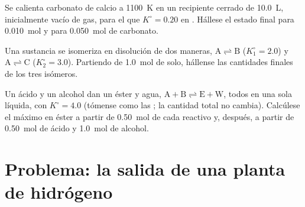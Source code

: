 \begin{exercise}[$\star\star\star$]\label{exo:b1:extent-q-and-k:10}
Se calienta carbonato de calcio a \qty{1100}{K} en un recipiente cerrado
de \qty{10.0}{L}, inicialmente vacío de gas, para el que $K^\circ = 0.20$
en . Hállese el estado final para
\qty{0.010}{mol} y para \qty{0.050}{mol} de carbonato.
\end{exercise}

\begin{exercise}[$\star\star\star$]\label{exo:b1:extent-q-and-k:11}
Una sustancia  se isomeriza en disolución de dos maneras,
$\mathrm{A \rightleftharpoons B}$
($K_1^\circ = 2.0$) y $\mathrm{A \rightleftharpoons C}$ ($K_2^\circ = 3.0$).
Partiendo de \qty{1.0}{mol} de  solo, hállense las cantidades
finales de los tres isómeros.
\end{exercise}

\begin{exercise}[$\star\star\star$]\label{exo:b1:extent-q-and-k:12}
Un ácido  y un alcohol  dan un éster y agua, $\mathrm{A + B
\rightleftharpoons E + W}$, todos en una sola  líquida, con $K^\circ = 4.0$
(tómense como  las ; la cantidad total no
cambia). Calcúlese el  máximo en éster a partir de
\qty{0.50}{mol} de cada reactivo y, después, a partir de \qty{0.50}{mol}
de ácido y \qty{1.0}{mol} de alcohol.
\end{exercise}

\section{Problema: la salida de una planta de hidrógeno}

